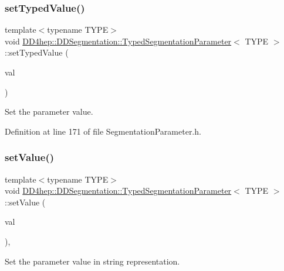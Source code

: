\subsubsection{\texorpdfstring{set\+Typed\+Value()}{setTypedValue()}}
{\footnotesize\ttfamily template$<$typename T\+Y\+PE$>$ \\
void \hyperlink{class_d_d4hep_1_1_d_d_segmentation_1_1_typed_segmentation_parameter}{D\+D4hep\+::\+D\+D\+Segmentation\+::\+Typed\+Segmentation\+Parameter}$<$ T\+Y\+PE $>$\+::set\+Typed\+Value (\begin{DoxyParamCaption}\item[{const T\+Y\+PE \&}]{val }\end{DoxyParamCaption})\hspace{0.3cm}{\ttfamily [inline]}}



Set the parameter value. 



Definition at line 171 of file Segmentation\+Parameter.\+h.

\hypertarget{class_d_d4hep_1_1_d_d_segmentation_1_1_typed_segmentation_parameter_a32e4b30c056572c1892b0607d05774e2}{}\label{class_d_d4hep_1_1_d_d_segmentation_1_1_typed_segmentation_parameter_a32e4b30c056572c1892b0607d05774e2} 
\subsubsection{\texorpdfstring{set\+Value()}{setValue()}}
{\footnotesize\ttfamily template$<$typename T\+Y\+PE$>$ \\
void \hyperlink{class_d_d4hep_1_1_d_d_segmentation_1_1_typed_segmentation_parameter}{D\+D4hep\+::\+D\+D\+Segmentation\+::\+Typed\+Segmentation\+Parameter}$<$ T\+Y\+PE $>$\+::set\+Value (\begin{DoxyParamCaption}\item[{const std\+::string \&}]{val }\end{DoxyParamCaption})\hspace{0.3cm}{\ttfamily [inline]}, {\ttfamily [virtual]}}



Set the parameter value in string representation. 



